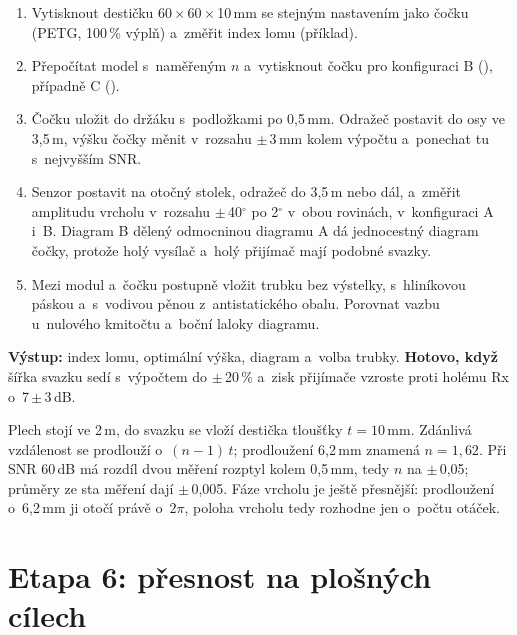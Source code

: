 \documentclass[czech]{skyren}
\begin{document}
\begin{enumerate}
\item Vytisknout destičku 60\,$\times$\,60\,$\times$\,10\,mm se stejným
  nastavením jako čočku (PETG, 100\,\% výplň) a~změřit index lomu (příklad).
\item Přepočítat model s~naměřeným $n$ a~vytisknout čočku pro konfiguraci B
  (), případně C ().
\item Čočku uložit do držáku s~podložkami po 0,5\,mm. Odražeč postavit do
  osy ve 3,5\,m, výšku čočky měnit v~rozsahu $\pm$\,3\,mm kolem výpočtu
  a~ponechat tu s~nejvyšším SNR.
\item Senzor postavit na otočný stolek, odražeč do 3,5\,m nebo dál,
  a~změřit amplitudu vrcholu v~rozsahu $\pm$\,40$^\circ$ po 2$^\circ$ v~obou
  rovinách, v~konfiguraci A i~B. Diagram B dělený odmocninou diagramu A dá
  jednocestný diagram čočky, protože holý vysílač a~holý přijímač mají
  podobné svazky.
\item Mezi modul a~čočku postupně vložit trubku bez výstelky, s~hliníkovou
  páskou a~s~vodivou pěnou z~antistatického obalu. Porovnat vazbu u~nulového
  kmitočtu a~boční laloky diagramu.
\end{enumerate}

\textbf{Výstup:} index lomu, optimální výška, diagram a~volba trubky.
\textbf{Hotovo, když} šířka svazku sedí s~výpočtem do $\pm$\,20\,\%
a~zisk přijímače vzroste proti holému Rx o~7\,$\pm$\,3\,dB.

\begin{skyrenexample}
Plech stojí ve 2\,m, do svazku se vloží destička tloušťky $t = 10$\,mm.
Zdánlivá vzdálenost se prodlouží o~$(n-1)\,t$; prodloužení 6,2\,mm znamená
$n = 1{,}62$. Při SNR 60\,dB má rozdíl dvou měření rozptyl kolem 0,5\,mm,
tedy $n$ na $\pm$\,0,05; průměry ze sta měření dají $\pm$\,0,005. Fáze
vrcholu je ještě přesnější: prodloužení o~6,2\,mm ji otočí právě o~$2\pi$,
poloha vrcholu tedy rozhodne jen o~počtu otáček.
\end{skyrenexample}

\section{Etapa 6: přesnost na plošných cílech}
\end{document}

